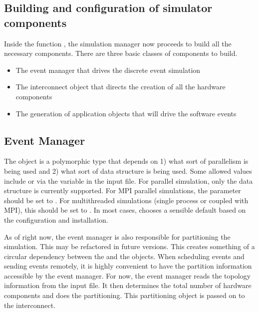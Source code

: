 \begin{enumerate}
\section{Building and configuration of simulator components}
Inside the function ,
the simulation manager now proceeds to build all the necessary components.
There are three basic classes of components to build.

\begin{itemize}
\item The event manager that drives the discrete event simulation
\item The interconnect object that directs the creation of all the hardware components
\item The generation of application objects that will drive the software events
\end{itemize}

\subsection{Event Manager}
The  object is a polymorphic type that depends on 1) what sort of parallelism is being used and 2) what sort of data structure is being used.
Some allowed values include  or  via the  variable in the input file.
For parallel simulation, only the  data structure is currently supported.
For MPI parallel simulations, the  parameter should be set to .
For multithreaded simulations (single process or coupled with MPI), this should be set to .
In most cases, \sstmacro chooses a sensible default based on the configuration and installation.

As of right now, the event manager is also responsible for partitioning the simulation.
This may be refactored in future versions.
This creates something of a circular dependency between the  and the  objects.
When scheduling events and sending events remotely,
it is highly convenient to have the partition information accessible by the event manager.
For now, the event manager reads the topology information from the input file.
It then determines the total number of hardware components and does the partitioning.
This partitioning object is passed on to the interconnect.


\end{enumerate}
